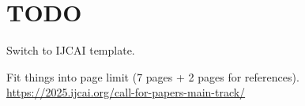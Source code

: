\section*{TODO}
\label{sec:todo}

\begin{tightenum}
\item Switch to IJCAI template.
\item Fit things into page limit (7 pages + 2 pages for references).
    \\ \url{https://2025.ijcai.org/call-for-papers-main-track/}
\end{tightenum}
